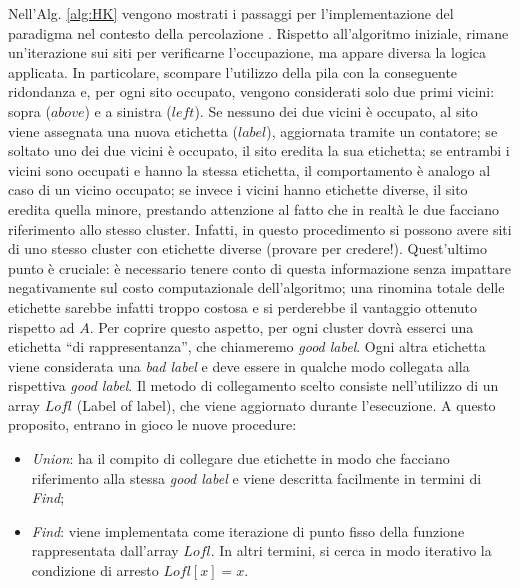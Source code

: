Nell'Alg. \ref{alg:HK} vengono mostrati i passaggi per l'implementazione 
del paradigma nel contesto della percolazione \cite{pseudoHK}.
Rispetto all'algoritmo iniziale, rimane un'iterazione sui siti per verificarne
l'occupazione, ma appare diversa la logica applicata. In particolare, scompare
l'utilizzo della pila con la conseguente ridondanza e, per 
ogni sito occupato, vengono considerati solo due primi vicini: sopra (\textit{$above$}) 
e a sinistra ($left$). Se nessuno dei due vicini è occupato, al sito 
viene assegnata una nuova etichetta ($label$), aggiornata tramite un contatore;
se soltato uno dei due vicini è occupato, il sito eredita la sua etichetta;
se entrambi i vicini sono occupati e hanno la stessa etichetta, il comportamento
è analogo al caso di un vicino occupato; se invece i vicini hanno etichette diverse, 
il sito eredita quella minore, prestando attenzione al fatto che in realtà 
le due facciano riferimento allo stesso cluster.
Infatti, in questo procedimento si possono avere siti di uno 
stesso cluster con etichette diverse (provare per credere!).
Quest'ultimo punto è cruciale: è necessario tenere conto di questa informazione
senza impattare negativamente sul costo computazionale dell'algoritmo; una rinomina
totale delle etichette sarebbe infatti troppo costosa e si perderebbe il vantaggio
ottenuto rispetto ad $A$.
Per coprire questo aspetto, per ogni cluster dovrà esserci una etichetta 
``di rappresentanza'', che chiameremo \textit{good label}. Ogni altra etichetta viene 
considerata una \textit{bad label} e deve essere in qualche modo collegata alla rispettiva
\textit{good label}. Il metodo di collegamento scelto consiste nell'utilizzo di un array 
$Lofl$ (Label of label), che viene aggiornato durante l'esecuzione. 
A questo proposito, entrano in gioco le nuove procedure:
\begin{itemize}
    \item \textit{Union}: ha il compito di collegare due etichette\footnotemark{} in modo che facciano 
    riferimento alla stessa \textit{good label} e viene descritta facilmente in termini di \textit{Find};
    \item \textit{Find}: viene implementata come iterazione di punto fisso 
        della funzione rappresentata dall'array $Lofl$. In 
        altri termini, si cerca in modo iterativo la condizione di arresto $Lofl[x]=x$.
\end{itemize}

